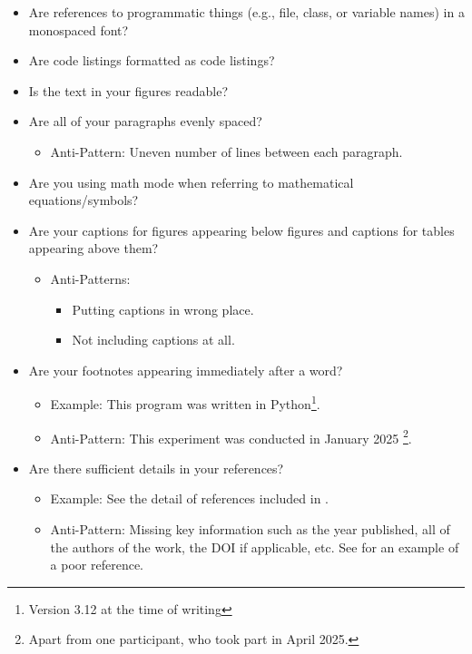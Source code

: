 \begin{itemize}
    \item Are references to programmatic things (e.g., file, class, or variable names) in a monospaced font?

    \item Are code listings formatted as code listings?
    
    \item Is the text in your figures readable?  

    \item Are all of your paragraphs evenly spaced?  
    \begin{itemize}
        \item Anti-Pattern: Uneven number of lines between each paragraph.
    \end{itemize}

    \item Are you using math mode when referring to mathematical equations/symbols?  

    \item Are your captions for figures appearing below figures and captions for tables appearing above them?
    \begin{itemize}
        \item Anti-Patterns:
        \begin{itemize}
            \item Putting captions in wrong place.
            \item Not including captions at all.
        \end{itemize}
    \end{itemize}

    \item Are your footnotes appearing immediately after a word?
    \begin{itemize}
        \item Example: This program was written in Python\footnote{Version 3.12 at the time of writing}.
        \item Anti-Pattern: This experiment was conducted in January 2025 \footnote{Apart from one participant, who took part in April 2025.}.
    \end{itemize}

    \item Are there sufficient details in your references?
    \begin{itemize}
        \item Example: See the detail of references included in \citet{CaseOfDisappearingTeaspoons}.
        \item Anti-Pattern: Missing key information such as the year published, all of the authors of the work, the DOI if applicable, etc. See \citet{BadReference} for an example of a poor reference.
    \end{itemize}

\end{itemize}